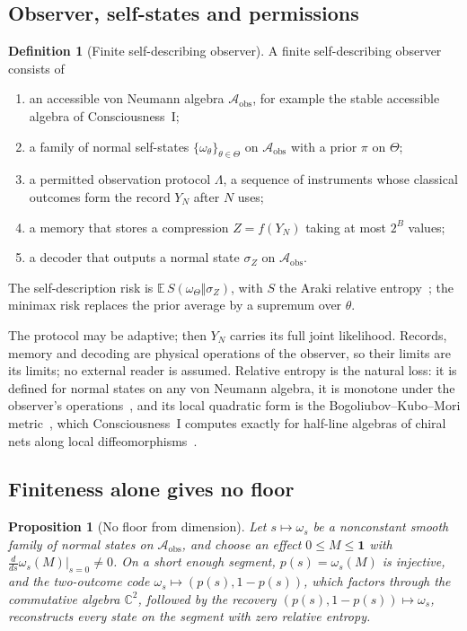 \documentclass[12pt]{article}
\newtheorem{proposition}[theorem]{Proposition}
\theoremstyle{definition}
\newtheorem{definition}[theorem]{Definition}
\theoremstyle{remark}
\newcommand{\E}{\mathbb E}
\begin{document}
\subsection{Observer, self-states and permissions}

\begin{definition}[Finite self-describing observer]\label{def:observer}
A finite self-describing observer consists of
\begin{enumerate}[itemsep=1pt]
\item an accessible von Neumann algebra $\mathcal A_{\mathrm{obs}}$, for example the stable accessible algebra of Consciousness~I;
\item a family of normal self-states $\{\omega_\theta\}_{\theta\in\Theta}$ on $\mathcal A_{\mathrm{obs}}$ with a prior $\pi$ on $\Theta$;
\item a permitted observation protocol $\Lambda$, a sequence of instruments whose classical outcomes form the record $Y_N$ after $N$ uses;
\item a memory that stores a compression $Z=f(Y_N)$ taking at most $2^B$ values;
\item a decoder that outputs a normal state $\sigma_Z$ on $\mathcal A_{\mathrm{obs}}$.
\end{enumerate}
The self-description risk is $\E\,S(\omega_\Theta\Vert\sigma_Z)$, with $S$ the Araki relative entropy~\cite{Araki1976}; the minimax risk replaces the prior average by a supremum over $\theta$.
\end{definition}

The protocol may be adaptive; then $Y_N$ carries its full joint likelihood. Records, memory and decoding are physical operations of the observer, so their limits are its limits; no external reader is assumed. Relative entropy is the natural loss: it is defined for normal states on any von Neumann algebra, it is monotone under the observer's operations~\cite{Petz1986}, and its local quadratic form is the Bogoliubov--Kubo--Mori metric~\cite{Petz1996}, which Consciousness~I computes exactly for half-line algebras of chiral nets along local diffeomorphisms~\cite{PaperI}.

\subsection{Finiteness alone gives no floor}

\begin{proposition}[No floor from dimension]\label{prop:noFloor}
Let $s\mapsto\omega_s$ be a nonconstant smooth family of normal states on $\mathcal A_{\mathrm{obs}}$, and choose an effect $0\le M\le\mathbf 1$ with $\frac{d}{ds}\omega_s(M)|_{s=0}\neq0$. On a short enough segment, $p(s)=\omega_s(M)$ is injective, and the two-outcome code $\omega_s\mapsto(p(s),1-p(s))$, which factors through the commutative algebra $\mathbb C^2$, followed by the recovery $(p(s),1-p(s))\mapsto\omega_s$, reconstructs every state on the segment with zero relative entropy.
\end{proposition}
\end{document}
